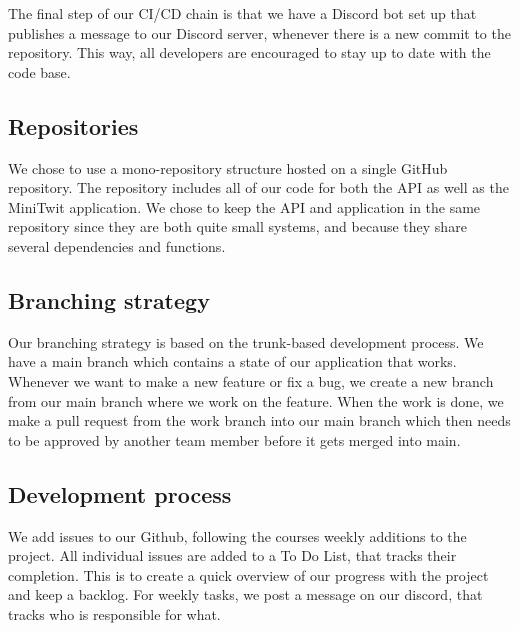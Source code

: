 \begin{itemize}
\begin{itemize}
    \end{itemize}    
\end{itemize}


The final step of our CI/CD chain is that we have a Discord bot set up that publishes a message to our Discord server, whenever there is a new commit to the repository. This way, all developers are encouraged to stay up to date with the code base.

\subsection{Repositories}
We chose to use a mono-repository structure hosted on a single GitHub repository. The repository  includes all of our code for both the API as well as the MiniTwit application. 
We chose to keep the API and application in the same repository since they are both quite small systems, and because they share several dependencies and functions.


\subsection{Branching strategy}
Our branching strategy is based on the trunk-based development process.
We have a main branch which contains a state of our application that works. Whenever we want to make a new feature or fix a bug, we create a new branch from our main branch where we work on the feature. When the work is done, we make a pull request from the work branch into our main branch which then needs to be approved by another team member before it gets merged into main.

\subsection{Development process}
We add issues to our Github, following the courses weekly additions to the project. All individual issues are added to a To Do List, that tracks their completion. This is to create a quick overview of our progress with the project and keep a backlog.
For weekly tasks, we post a message on our discord, that tracks who is responsible for what.


